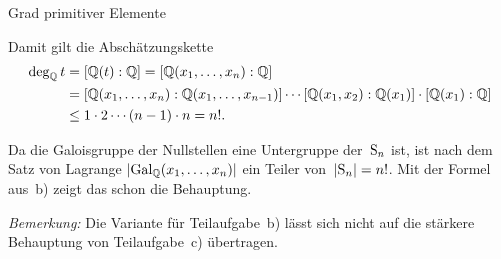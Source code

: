 \documentclass{algblatt}
\begin{document}
\begin{aufgabe}{Grad primitiver Elemente}
\begin{loesungE}
Damit gilt die Abschätzungskette
\begin{align*}
  \deg_{\mathbb{Q}} t &= [\mathbb{Q}(t):\mathbb{Q}] = [\mathbb{Q}(x_1,\ldots,x_n):\mathbb{Q}] \\
  &= [\mathbb{Q}(x_1,\ldots,x_n):\mathbb{Q}(x_1,\ldots,x_{n-1})] \cdots
    [\mathbb{Q}(x_1,x_2):\mathbb{Q}(x_1)] \cdot [\mathbb{Q}(x_1):\mathbb{Q}] \\
  &\leq 1 \cdot 2 \cdots (n-1) \cdot n = n!.
\end{align*}

\item Da die Galoisgruppe der Nullstellen eine Untergruppe der~$\mathrm{S}_n$ ist, ist
nach dem Satz von Lagrange $|\mathrm{Gal}_{\mathbb{Q}}(x_1,\ldots,x_n)|$ ein Teiler von~$|\mathrm{S}_n| =
n!$. Mit der Formel aus~b) zeigt das schon die Behauptung.

\emph{Bemerkung:} Die Variante für Teilaufgabe~b) lässt sich nicht auf die
stärkere Behauptung von Teilaufgabe~c) übertragen.
\end{loesungE}
\end{aufgabe}
\end{document}
